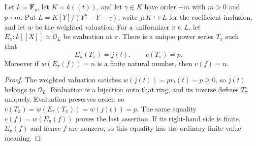 \begin{lemma}
\label{lem:artin-schreier-base-parameter}
\leanok
Let $k=\mathbf F_p$, let $K=k((t))$, and let $\gamma\in K$
have order $-m$ with $m>0$ and $p\nmid m$.
Put $L=K[Y]/(Y^p-Y-\gamma)$, write $j:K\hookrightarrow L$
for the coefficient inclusion, and let $w$ be the weighted valuation.
For a uniformizer $\pi\in L$, let
$E_\pi:k[[X]]\simeq\mathcal O_L$ be evaluation at $\pi$.
There is a unique power series $T_\pi$ such that
\[
 E_\pi(T_\pi)=j(t),\qquad v(T_\pi)=p.
\]
Moreover if $w(E_\pi(f))=n$ is a finite natural number, then
$v(f)=n$.
\end{lemma}

\begin{proof}
The weighted valuation satisfies $w(j(t))=pv_t(t)=p\ge0$,
so $j(t)$ belongs to $\mathcal O_L$. Evaluation is a bijection
onto that ring, and its inverse defines $T_\pi$ uniquely.
Evaluation preserves order, so
$v(T_\pi)=w(E_\pi(T_\pi))=w(j(t))=p$.
The same equality $v(f)=w(E_\pi(f))$ proves the last assertion.
If its right-hand side is finite, $E_\pi(f)$ and hence $f$ are
nonzero, so this equality has the ordinary finite-value meaning.
\end{proof}


